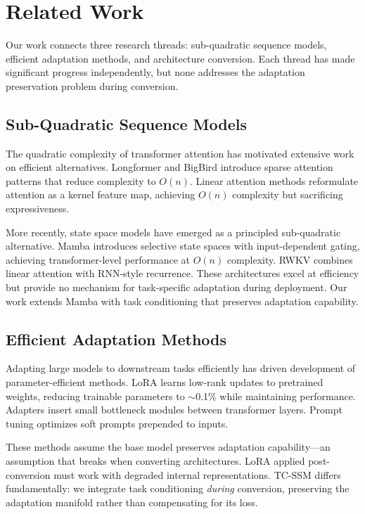 \section{Related Work}

Our work connects three research threads: sub-quadratic sequence models, efficient adaptation methods, and architecture conversion. Each thread has made significant progress independently, but none addresses the adaptation preservation problem during conversion.

\subsection{Sub-Quadratic Sequence Models}

The quadratic complexity of transformer attention has motivated extensive work on efficient alternatives. Longformer \cite{Beltagy2020Longformer} and BigBird \cite{Zaheer2020BigBird} introduce sparse attention patterns that reduce complexity to $O(n)$. Linear attention methods \cite{Katharopoulos2020Transformers} reformulate attention as a kernel feature map, achieving $O(n)$ complexity but sacrificing expressiveness.

More recently, state space models have emerged as a principled sub-quadratic alternative. Mamba \cite{Gu2023Mamba} introduces selective state spaces with input-dependent gating, achieving transformer-level performance at $O(n)$ complexity. RWKV \cite{Peng2023RWKV} combines linear attention with RNN-style recurrence. These architectures excel at efficiency but provide no mechanism for task-specific adaptation during deployment. Our work extends Mamba with task conditioning that preserves adaptation capability.

\subsection{Efficient Adaptation Methods}

Adapting large models to downstream tasks efficiently has driven development of parameter-efficient methods. LoRA \cite{Hu2021LoRA} learns low-rank updates to pretrained weights, reducing trainable parameters to $\sim$0.1\% while maintaining performance. Adapters \cite{Houlsby2019Adapters} insert small bottleneck modules between transformer layers. Prompt tuning \cite{Lester2021Prompt} optimizes soft prompts prepended to inputs.

These methods assume the base model preserves adaptation capability---an assumption that breaks when converting architectures. LoRA applied post-conversion must work with degraded internal representations. TC-SSM differs fundamentally: we integrate task conditioning \textit{during} conversion, preserving the adaptation manifold rather than compensating for its loss.

